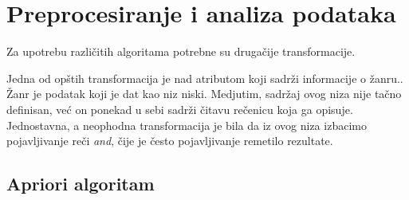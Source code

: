 \section{Preprocesiranje i analiza podataka}
\label{sec:Preprocesiranje}

Za upotrebu razli\v{c}itih algoritama potrebne su druga\v{c}ije transformacije.

Jedna od op\v{s}tih transformacija je nad atributom koji sadr\v{z}i informacije o \v{z}anru.. \v{Z}anr je podatak koji je dat kao niz niski. Medjutim, sadr\v{z}aj ovog niza nije ta\v{c}no definisan, ve\'c{} on ponekad u sebi sadr\v{z}i \v{c}itavu re\v{c}enicu koja ga opisuje. Jednostavna, a neophodna transformacija je bila da iz ovog niza izbacimo pojavljivanje re\v{c}i \emph{and}, \v{c}ije je \v{c}esto pojavljivanje remetilo rezultate. 

\subsection{Apriori algoritam}
\label{subsec:Apriori}

